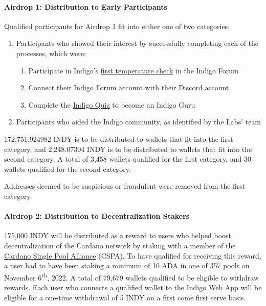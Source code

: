 \documentclass{article}
\begin{document}
\begin{sloppypar}
\hypertarget{airdrop-1-distribution-to-early-participants}{%
\paragraph{Airdrop 1: Distribution to Early
Participants}\label{airdrop-1-distribution-to-early-participants}}

Qualified participants for Airdrop 1 fit into either one of two
categories:

\begin{enumerate}
\item
  Participants who showed their interest by successfully completing each
  of the processes, which were:

  \begin{enumerate}
  \item
    Participate in Indigo's
    \href{https://forum.indigoprotocol.io/t/indigo-initial-token-distribution-vote/1399}{first
    temperature check} in the Indigo Forum
  \item
    Connect their Indigo Forum account with their Discord account
  \item
    Complete the \href{https://quiz.indigoprotocol.io/}{Indigo Quiz} to
    become an Indigo Guru
  \end{enumerate}
\item
  Participants who aided the Indigo community, as identified by the
  Labs' team
\end{enumerate}

172,751.924982 INDY is to be distributed to wallets that fit into the
first category, and 2,248.07304 INDY is to be distributed to wallets
that fit into the second category. A total of 3,458 wallets qualified
for the first category, and 30 wallets qualified for the second
category.

Addresses deemed to be suspicious or fraudulent were removed from the
first category.

\hypertarget{airdrop-2-distribution-to-decentralization-stakers}{%
\paragraph{Airdrop 2: Distribution to Decentralization
Stakers}\label{airdrop-2-distribution-to-decentralization-stakers}}

175,000 INDY will be distributed as a reward to users who helped boost
decentralization of the Cardano network by staking with a member of the
\href{https://singlepoolalliance.net/}{Cardano Single Pool Alliance}
(CSPA). To have qualified for receiving this reward, a user had to have
been staking a minimum of 10 ADA in one of 357 pools on November
6\textsuperscript{th}, 2022. A total of 79,679 wallets qualified to be
eligible to withdraw rewards. Each user who connects a qualified wallet
to the Indigo Web App will be eligible for a one-time withdrawal of 5
INDY on a first come first serve basis.


\end{sloppypar}
\end{document}
